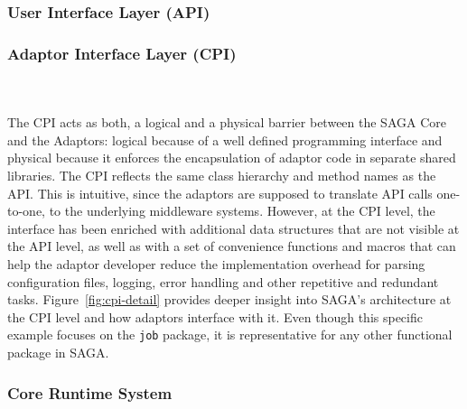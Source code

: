 

  \subsubsection{User Interface Layer (API)}
 
 
  \subsubsection{Adaptor Interface Layer (CPI)}
  \\
  \\
  The CPI acts as both,
  a logical and a physical barrier between the SAGA Core and the Adaptors:
  logical because of a well defined programming interface and physical because
  it enforces the encapsulation of adaptor code in separate shared libraries.
  The CPI reflects the same class hierarchy and method names as the API. This
  is intuitive, since the adaptors are supposed to translate API calls
  one-to-one, to the underlying middleware systems. However, at the CPI level,
  the interface has been enriched with additional data structures that are not
  visible at the API level, as well as with a set of convenience functions and
  macros that can help the adaptor developer reduce the implementation overhead
  for parsing configuration files, logging, error handling and other repetitive
  and redundant tasks. Figure~\ref{fig:cpi-detail} provides deeper insight into
  SAGA's architecture at the CPI level and how adaptors interface with it. Even
  though this specific example focuses on the \texttt{job} package, it is
  representative for any other functional package in SAGA.
 
 
  \subsubsection{Core Runtime System}


